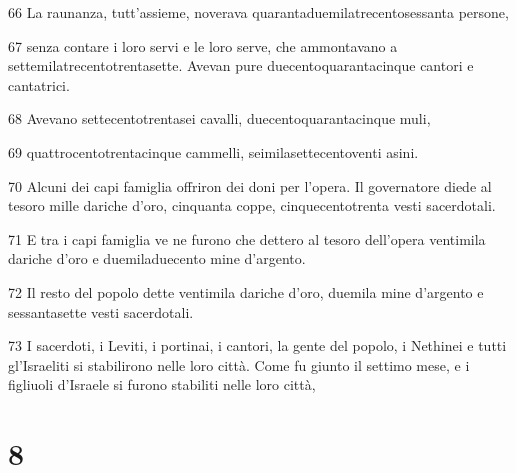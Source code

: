 \par 66 La raunanza, tutt'assieme, noverava quarantaduemilatrecentosessanta persone,
\par 67 senza contare i loro servi e le loro serve, che ammontavano a settemilatrecentotrentasette. Avevan pure duecentoquarantacinque cantori e cantatrici.
\par 68 Avevano settecentotrentasei cavalli, duecentoquarantacinque muli,
\par 69 quattrocentotrentacinque cammelli, seimilasettecentoventi asini.
\par 70 Alcuni dei capi famiglia offriron dei doni per l'opera. Il governatore diede al tesoro mille dariche d'oro, cinquanta coppe, cinquecentotrenta vesti sacerdotali.
\par 71 E tra i capi famiglia ve ne furono che dettero al tesoro dell'opera ventimila dariche d'oro e duemiladuecento mine d'argento.
\par 72 Il resto del popolo dette ventimila dariche d'oro, duemila mine d'argento e sessantasette vesti sacerdotali.
\par 73 I sacerdoti, i Leviti, i portinai, i cantori, la gente del popolo, i Nethinei e tutti gl'Israeliti si stabilirono nelle loro città. Come fu giunto il settimo mese, e i figliuoli d'Israele si furono stabiliti nelle loro città,

\chapter{8}

